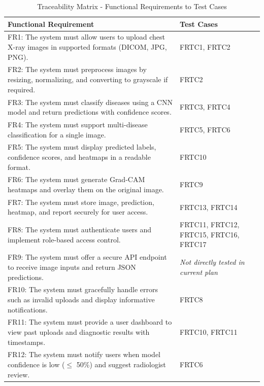 \documentclass[12pt, titlepage]{article}
\begin{document}
\begin{table}[h]
  \centering
  \begin{tabular}{|p{}|p{}|}
    \hline
    \textbf{Functional Requirement} & \textbf{Test Cases} \\
    \hline
    FR1: The system must allow users to upload chest X-ray images in supported formats (DICOM, JPG, PNG). & FRTC1, FRTC2 \\
    \hline
    FR2: The system must preprocess images by resizing, normalizing, and converting to grayscale if required. & FRTC2 \\
    \hline
    FR3: The system must classify diseases using a CNN model and return predictions with confidence scores. & FRTC3, FRTC4 \\
    \hline
    FR4: The system must support multi-disease classification for a single image. & FRTC5, FRTC6 \\
    \hline
    FR5: The system must display predicted labels, confidence scores, and heatmaps in a readable format. & FRTC10 \\
    \hline
    FR6: The system must generate Grad-CAM heatmaps and overlay them on the original image. & FRTC9 \\
    \hline
    FR7: The system must store image, prediction, heatmap, and report securely for user access. & FRTC13, FRTC14 \\
    \hline
    FR8: The system must authenticate users and implement role-based access control. & FRTC11, FRTC12, FRTC15, FRTC16, FRTC17 \\
    \hline
    FR9: The system must offer a secure API endpoint to receive image inputs and return JSON predictions. & \textit{Not directly tested in current plan} \\
    \hline
    FR10: The system must gracefully handle errors such as invalid uploads and display informative notifications. & FRTC8 \\
    \hline
    FR11: The system must provide a user dashboard to view past uploads and diagnostic results with timestamps. & FRTC10, FRTC11 \\
    \hline
    FR12: The system must notify users when model confidence is low ($\leq$ 50\%) and suggest radiologist review. & FRTC6 \\
    \hline
  \end{tabular}
  \caption{Traceability Matrix - Functional Requirements to Test Cases}
\end{table}

\pagebreak
\end{document}
